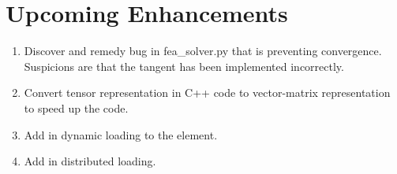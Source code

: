 \section{Upcoming Enhancements}

\begin{enumerate}
\item Discover and remedy bug in fea\_solver.py that is preventing convergence. Suspicions are that the tangent has been implemented incorrectly.
\item Convert tensor representation in C++ code to vector-matrix representation to speed up the code.
\item Add in dynamic loading to the element.
\item Add in distributed loading.
\end{enumerate}
